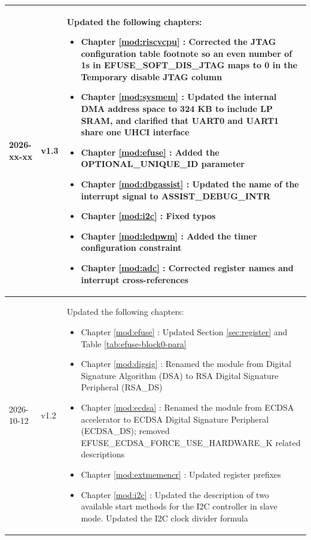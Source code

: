 \begin{longtable}[l]{ | m{2cm} | m{1.5cm} | m{12cm} | }
    2026-xx-xx & v1.3 &
    Updated the following chapters:
    \begin{itemize}
    \item Chapter \ref{mod:riscvcpu} \textit{\nameref{mod:riscvcpu}}: Corrected the JTAG configuration table footnote so an even number of 1s in EFUSE\_SOFT\_DIS\_JTAG maps to 0 in the Temporary disable JTAG column
    \item Chapter \ref{mod:sysmem} \textit{\nameref{mod:sysmem}}: Updated the internal DMA address space to 324 KB to include LP SRAM, and clarified that UART0 and UART1 share one UHCI interface
    \item Chapter \ref{mod:efuse} \textit{\nameref{mod:efuse}}: Added the OPTIONAL\_UNIQUE\_ID parameter %
    \item Chapter \ref{mod:dbgassist} \textit{\nameref{mod:dbgassist}}: Updated the name of the interrupt signal to ASSIST\_DEBUG\_INTR %
    \item Chapter \ref{mod:i2c} \textit{\nameref{mod:i2c}}: Fixed typos %
    \item Chapter \ref{mod:ledpwm} \textit{\nameref{mod:ledpwm}}: Added the timer configuration constraint %
    \item Chapter \ref{mod:adc} \textit{\nameref{mod:adc}}: Corrected register names and interrupt cross-references %
    \end{itemize}
    \\\hline
    2026-10-12 & v1.2 &
    Updated the following chapters:
    \begin{itemize}
    \item Chapter \ref{mod:efuse} \textit{\nameref{mod:efuse}}: Updated Section \ref{sec:register} \textit{\nameref{sec:register}} and Table \ref{tab:efuse-block0-para} %
    \item Chapter \ref{mod:digsig} \textit{\nameref{mod:digsig}}: Renamed the module from Digital Signature Algorithm (DSA) to RSA Digital Signature Peripheral (RSA\_DS) %
    \item Chapter \ref{mod:ecdsa} \textit{\nameref{mod:ecdsa}}: Renamed the module from ECDSA accelerator to ECDSA Digital Signature Peripheral (ECDSA\_DS); removed EFUSE\_ECDSA\_FORCE\_USE\_HARDWARE\_K related descriptions
    \item Chapter \ref{mod:extmemencr} \textit{\nameref{mod:extmemencr}}: Updated register prefixes
    \item Chapter \ref{mod:i2c} \textit{\nameref{mod:i2c}}: Updated the description of two available start methods for the I2C controller in slave mode. Updated the I2C clock divider formula %

\end{itemize}
\end{longtable}
